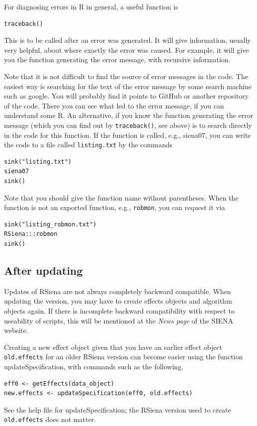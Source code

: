 \documentclass[a4paper,fleqn,11pt]{article}
\newcommand{\+}{\, + \,}
\newcommand{\sfn}[1]{\textsf{#1}}
\newcommand{\RS}{{\sf RSiena }}
\newcommand{\SI}{{\sf SIENA }}
\begin{document}
For diagnosing errors in R in general, a useful function is
\begin{verbatim}
traceback()
\end{verbatim}
This is to be called after an error was generated. It will give information,
usually very helpful, about where exactly the error was caused.
For example, it will give you the function generating the error message,
with recursive information.
\medskip

Note that it is not difficult to find the source of error messages in the code.
The easiest way is searching for the text of the error message
by some search machine such as google.
You will probably find it points to GitHub or another repository of the code.
There you can see what led to the error message, if you can understand some R.
An alternative, if you know the function generating the error message
(which you can find out by \texttt{traceback()}, see above)
is to search directly in the code for this function.
If the function is called, e.g., \textsf{siena07}, you can write
the code to a file called \texttt{listing.txt} by the commands
\begin{verbatim}
sink("listing.txt")
siena07
sink()
\end{verbatim}
Note that you should give the function name without parentheses.
When the function is not an exported function, e.g., \texttt{robmon},
you can request it via
\begin{verbatim}
sink("listing_robmon.txt")
RSiena:::robmon
sink()
\end{verbatim}


\subsection{After updating}

\noindent
Updates of \RS are not always completely backward
compatible. When updating the version, you may have to create
effects objects and algorithm objects again. If there is
incomplete backward compatibility with respect to
useability of scripts, this will be mentioned at the \emph{News page}
of the \SI website.

Creating a new effect object given that you have an earlier effect
object \texttt{old.effects} for an older \RS version can become
easier using the function \sfn{updateSpecification},
with commands such as the following.
\begin{verbatim}
eff0 <- getEffects(data_object)
new.effects <- updateSpecification(eff0, old.effects)
\end{verbatim}
See the help file for  \sfn{updateSpecification};
the \RS version used to create \texttt{old.effects} does not matter.
\end{document}
